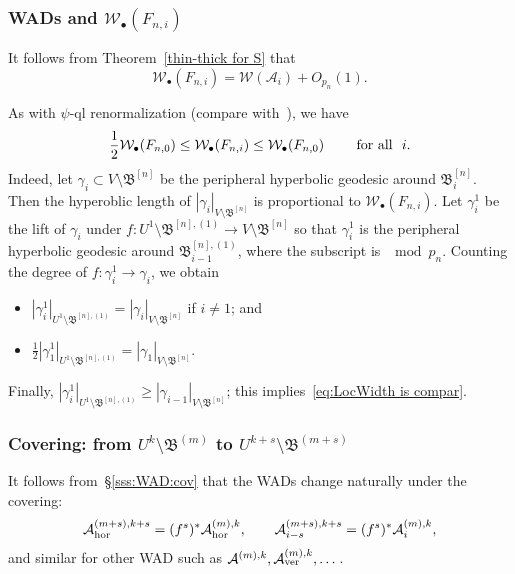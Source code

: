\documentclass{amsart}
\newcommand{\bush}{{\mathfrak B }}
\newcommand{\bbush}{{\boldsymbol {\mathfrak B} }}
\newcommand{\1}{{\mathbb 1 }}
\newcommand{\Width}{{\mathcal W}}
\renewcommand{\AA}{{\mathcal A}}
\begin{document}
\subsubsection{WADs and $\Width_\bullet(F_{n,i})$} \label{sss:Width:F_ni} It follows from Theorem~\ref{thin-thick for S} that
\begin{equation}
\label{eq:Width is Loc WAD}
\Width_\bullet(F_{n,i}) = \Width(\AA_i)+O_{p_n}(1).
\end{equation}

As with $\psi$-ql renormalization (compare with~\cite[Theorem 9.3]{McM1}), we have
\begin{equation}
\label{eq:LocWidth is compar}
\frac 12\Width_\bullet(F_{n, 0}) \le \Width_\bullet(F_{n, i}) \le \Width_\bullet(F_{n, 0})\hspace{0.7cm} \text{ for all }\ i.
\end{equation}
Indeed, let $\gamma_i \subset V\setminus \bbush^{[n]}$ be the peripheral hyperbolic geodesic around $\bush^{[n]}_{i}$. Then the hyperoblic length of $|\gamma_i|_{V\setminus \bbush^{[n]}}$ is proportional to $\Width_\bullet(F_{n,i})$. Let $\gamma^{1}_i$ be the lift of $\gamma_i$ under $f\colon U^{1}\setminus \bbush^{[n],(1)}\to V\setminus \bbush^{[n]}$ so that $\gamma^{1}_i$ is the peripheral hyperbolic geodesic around $\bush^{[n],(1)}_{i-1}$, where the subscript is $\mod p_n$. Counting the degree of $f\colon \gamma^1_i\to \gamma_i$, we obtain 
\begin{itemize}
\item $|\gamma^1_i|_{U^{1}\setminus \bbush^{[n],(1)}}=|\gamma_i|_{V\setminus \bbush^{[n]}}$ if $i\not=1$; and
\item $\frac 12|\gamma^1_1|_{U^{1}\setminus \bbush^{[n],(1)}}=|\gamma_1|_{V\setminus \bbush^{[n]}}$.
\end{itemize}
Finally, $|\gamma^1_i|_{U^{1}\setminus \bbush^{[n],(1)}}\ge |\gamma_{i-1}|_{V\setminus \bbush^{[n]}}$; this implies~\eqref{eq:LocWidth is compar}. 




 
\subsubsection{Covering: from $U^{k}\setminus \bbush^{(m)}$ to $U^{k+s}\setminus \bbush^{(m+s)}$}\label{sss:WAD:covering:psi maps}
It follows from~\S\ref{sss:WAD:cov} that the WADs change naturally under the covering:
\begin{equation}
\label{eq:WAD:under coverin} \AA^{(m+s),k+s}_\hor =(f^s)^* \AA^{(m),k}_\hor, \hspace{0.7cm} \AA^{(m+s),k+s}_{i-s} =(f^s)^* \AA^{(m),k}_i,
\end{equation}
and similar for other WAD such as $\AA^{(m),k}, \AA^{(m),k}_\ver,\dots$.
\end{document}
